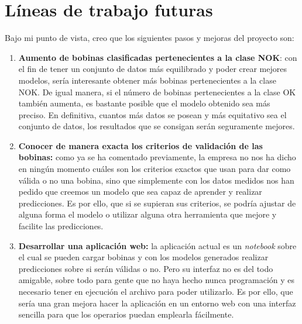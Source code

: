 \section{Líneas de trabajo futuras}
Bajo mi punto de vista, creo que los siguientes pasos y mejoras del proyecto son:
\begin{enumerate}
    \item \textbf{Aumento de bobinas clasificadas pertenecientes a la clase NOK}: con el fin de tener un conjunto de datos más equilibrado y poder crear mejores modelos, sería interesante obtener más bobinas pertenecientes a la clase NOK. De igual manera, si el número de bobinas pertenecientes a la clase OK también aumenta, es bastante posible que el modelo obtenido sea más preciso. En definitiva, cuantos más datos se posean y más equitativo sea el conjunto de datos, los resultados que se consigan serán seguramente mejores.
    \item \textbf{Conocer de manera exacta los criterios de validación de las bobinas:} como ya se ha comentado previamente, la empresa no nos ha dicho en ningún momento cuáles son los criterios exactos que usan para dar como válida o no una bobina, sino que simplemente con los datos medidos nos han pedido que creemos un modelo que sea capaz de aprender y realizar predicciones. Es por ello, que si se supieran sus criterios, se podría ajustar de alguna forma el modelo o utilizar alguna otra herramienta que mejore y facilite las predicciones.
    \item \textbf{Desarrollar una aplicación web:} la aplicación actual es un \emph{notebook} sobre el cual se pueden cargar bobinas y con los modelos generados realizar predicciones sobre si serán válidas o no. Pero su interfaz no es del todo amigable, sobre todo para gente que no haya hecho nunca programación y es necesario tener en ejecución el archivo para poder utilizarlo. Es por ello, que sería una gran mejora hacer la aplicación en un entorno web con una interfaz sencilla para que los operarios puedan emplearla fácilmente.
\end{enumerate}
